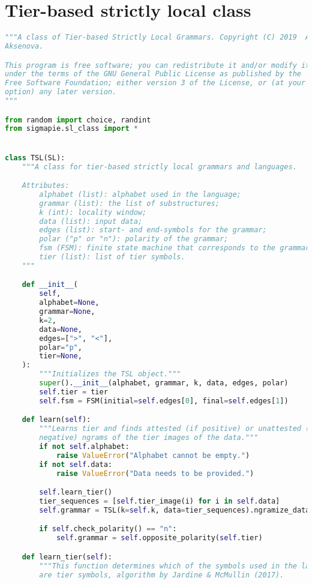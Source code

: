 \section{Tier-based strictly local class}

\begin{lstlisting}[language=Python]
"""A class of Tier-based Strictly Local Grammars. Copyright (C) 2019  Alena
Aksenova.

This program is free software; you can redistribute it and/or modify it
under the terms of the GNU General Public License as published by the
Free Software Foundation; either version 3 of the License, or (at your
option) any later version.
"""

from random import choice, randint
from sigmapie.sl_class import *


class TSL(SL):
    """A class for tier-based strictly local grammars and languages.

    Attributes:
        alphabet (list): alphabet used in the language;
        grammar (list): the list of substructures;
        k (int): locality window;
        data (list): input data;
        edges (list): start- and end-symbols for the grammar;
        polar ("p" or "n"): polarity of the grammar;
        fsm (FSM): finite state machine that corresponds to the grammar;
        tier (list): list of tier symbols.
    """

    def __init__(
        self,
        alphabet=None,
        grammar=None,
        k=2,
        data=None,
        edges=[">", "<"],
        polar="p",
        tier=None,
    ):
        """Initializes the TSL object."""
        super().__init__(alphabet, grammar, k, data, edges, polar)
        self.tier = tier
        self.fsm = FSM(initial=self.edges[0], final=self.edges[1])

    def learn(self):
        """Learns tier and finds attested (if positive) or unattested (if
        negative) ngrams of the tier images of the data."""
        if not self.alphabet:
            raise ValueError("Alphabet cannot be empty.")
        if not self.data:
            raise ValueError("Data needs to be provided.")

        self.learn_tier()
        tier_sequences = [self.tier_image(i) for i in self.data]
        self.grammar = TSL(k=self.k, data=tier_sequences).ngramize_data()

        if self.check_polarity() == "n":
            self.grammar = self.opposite_polarity(self.tier)

    def learn_tier(self):
        """This function determines which of the symbols used in the language
        are tier symbols, algorithm by Jardine & McMullin (2017).


\end{lstlisting}
